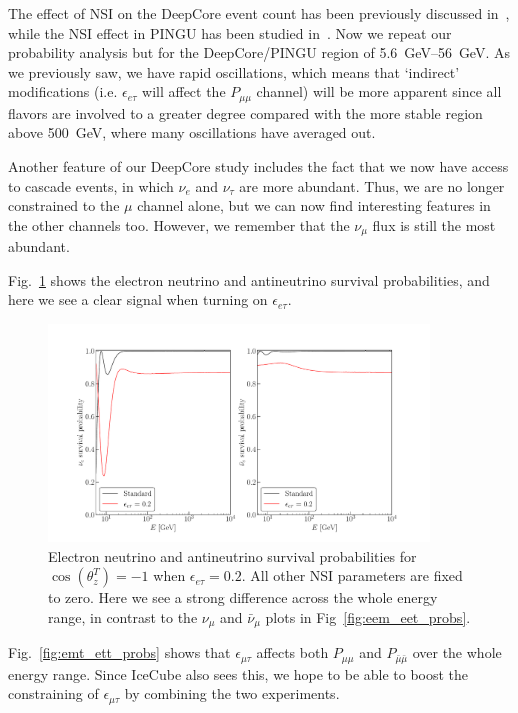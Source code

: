 \documentclass{article}
\newcommand{\ztrue}{\ensuremath{\cos{(\theta_z^{T})}}}
\newcommand{\emt}{\ensuremath{\epsilon_{\mu\tau}}}
\newcommand{\eet}{\epsilon_{e\tau}}
\renewcommand{\ne}{\nu_e}
\newcommand{\nm}{\nu_\mu}
\newcommand{\nt}{\nu_\tau}
\newcommand{\anm}{\bar\nu_\mu}
\newcommand{\Pmm}{P_{\mu\mu}}
\newcommand{\Pamam}{P_{\bar{\mu}  \bar{\mu}}}
\begin{document}
The effect of NSI on the DeepCore event count has been previously discussed in~\cite{smirnovNSI}, while the NSI effect 
in PINGU has been studied in~\cite{choubey2014, ohlsson2013}.
Now we repeat our probability analysis but for the DeepCore/PINGU region of \SIrange{5.6}{56}{\GeV}. As we previously saw,
we have rapid oscillations, which means that `indirect' modifications (i.e. $\eet$ will affect the $\Pmm$ channel)
will be more apparent since all flavors are involved to a greater degree compared with the more stable region above \SI{500}{\GeV}, where 
many oscillations have averaged out.

Another feature of our DeepCore study includes the fact that we now have access to cascade events, in which $\ne$ and $\nt$ are more abundant.
Thus, we are no longer constrained to the $\mu$ channel alone, but we can now find interesting features in the other channels too. However, we 
remember that the $\nm$ flux is still the most abundant.

Fig.~\ref{fig:Pee_eet_probs} shows the electron neutrino and antineutrino survival probabilities, and here we see
a clear signal when turning on $\eet$. 

\begin{figure}
    \begin{center}
        \includegraphics[width=0.9\textwidth]{figures/Pee_eet_probs.pdf}
        \caption{Electron neutrino and antineutrino survival probabilities for
        $\ztrue = -1$ when $\eet = 0.2$. All other NSI parameters are fixed to zero. Here we see a strong difference across the whole energy range, in contrast to the $\nm$ and $\anm$ plots in Fig~\ref{fig:eem_eet_probs}.}
        \label{fig:Pee_eet_probs}
    \end{center}
\end{figure}

Fig.~\ref{fig:emt_ett_probs} shows that $\emt$ affects both $\Pmm$ and $\Pamam$ over the whole energy range. Since 
IceCube also sees this, we hope to be able to boost the constraining of $\emt$ by combining the two experiments.
\end{document}
